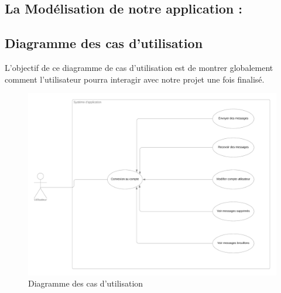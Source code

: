 \documentclass[french]{report}
\begin{document}
\begin{titlepage}
\section{\huge La Modélisation de notre application :}
\subsection{\LARGE Diagramme des cas d'utilisation }
\LARGE L'objectif de ce diagramme de cas d'utilisation est de montrer globalement comment l'utilisateur pourra interagir avec notre projet une fois finalisé.\\
\begin{figure}[H]
    \centering
    \includegraphics[width=1\textwidth]{DCU}
    \caption{Diagramme des cas d'utilisation}
    \label{fig:DCU}
\end{figure}

\end{titlepage}
\end{document}
